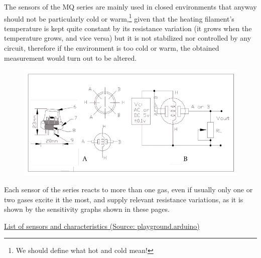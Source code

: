 \documentclass{article}\usepackage[]{graphicx}\usepackage[]{color}
\begin{document}
The sensors of the MQ series are mainly used in closed environments that anyway should not be particularly cold or warm,\footnote{We should define what hot and cold mean!} given that the heating filament's temperature is kept quite constant by its resistance variation (it grows when the temperature grows, and vice versa) but it is not stabilized nor controlled by any circuit, therefore if the environment is too cold or warm, the obtained measurement would turn out to be altered.

\begin{figure}
\includegraphics[width=1.0\textwidth]{MQ-X2.png}
\end{figure}

Each sensor of the series reacts to more than one gas, even if usually only one or two gases excite it the most, and supply relevant resistance variations, as it is shown by the sensitivity graphs shown in these pages.


\href{https://playground.arduino.cc/Main/MQGasSensors/#list}{List of sensors and characteristics (Source: playground.arduino)}
\end{document}
